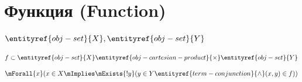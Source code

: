 
\section{Функция (Function)}

\hypertarget{obj-function}{}
\hypertarget{obj-function}{}
\begin{object}
\label{entity:obj-function}
$\entityref{obj-set}{X}, \entityref{obj-set}{Y}$

\[ f \subset \entityref{obj-set}{X} \entityref{obj-cartesian-product}{\times} \entityref{obj-set}{Y} \]
\[ \mForall{x} (x \in X \mImplies \mExists{! y} (y \in Y \entityref{term-conjunction}{\land} (x, y) \in f)) \]
\end{object}